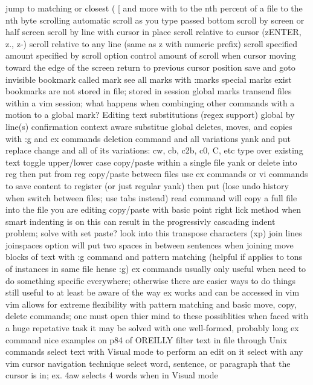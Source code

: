 \documentclass[12pt]{book}
\begin{document}
    jump to matching or closest ( { [ and more with %
    to the nth percent of a file
    to the nth byte
  scrolling
    automatic scroll as you type passed bottom
    scroll by screen or half screen
    scroll by line with cursor in place
    scroll relative to cursor (zENTER, z., z-)
    scroll relative to any line (same as z with numeric prefix)
    scroll specified amount specified by scroll option
    control amount of scroll when cursor moving toward the edge of the screen
  return to previous cursor position
  save and goto invisible bookmark  called mark
    see all marks with :marks
    special marks exist
    bookmarks are not stored in file; stored in session
    global marks transend files within a vim session; what happens when combinging other commands with a motion to a global mark?
Editing text
  substitutions (regex support)
    global
    by line(s)
    confirmation
    context aware substitue
  global deletes, moves, and copies with :g and ex commands
  deletion command and all variations
  yank and put
  replace
    change and all of its variations: cw, cb, c2b, c0, C, etc
    type over existing text
  toggle upper/lower case
  copy/paste within a single file
    yank or delete into reg then put from reg
  copy/paste between files
    use ex commands or vi commands to save content to register (or just regular yank) then put (lose undo history when switch between files; use tabs instead)
    read command will copy a full file into the file you are editing
  copy/paste with basic point right lick method
    when smart indenting is on this can result in the progressivly cascading indent problem; solve with set paste?  look into this
  transpose characters (xp)
  join lines
    joinspaces option will put two spaces in between sentences when joining
  move blocks of text
    with :g command and pattern matching (helpful if applies to tons of instances in same file hense :g)
  ex commands
    usually only useful when need to do something specific everywhere; otherwise there are easier ways to do things
    still useful to at least be aware of the way ex works and can be accessed in vim
    vim allows for extreme flexibility with pattern matching and basic move, copy, delete commands; one must open thier mind to these possiblities when faced with a huge repetative task
    it may be solved with one well-formed, probably long ex command
    nice examples on p84 of OREILLY
  filter text in file through Unix commands
  select text with Visual mode to perform an edit on it
    select with any vim cursor navigation technique
    select word, sentence, or paragraph that the cursor is in; ex. 4aw selects 4 words when in Visual mode
}
\end{document}
